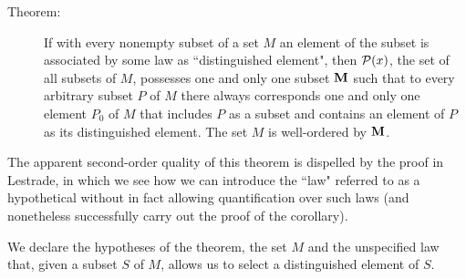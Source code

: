 \documentclass[12pt]{article}
\begin{document}
\begin{description}

\item[Theorem:]  If with every nonempty subset of a set $M$ an element of the subset is associated by some law as ``distinguished element", then ${\cal P}(x)$, the set of all subsets of $M$, possesses one and only one subset ${\bf M}$ such that to every arbitrary subset $P$ of $M$  there always corresponds one and only one element $P_0$ of $M$ that includes $P$ as a subset and contains an element of $P$ as its distinguished element.  The set $M$ is well-ordered by ${\bf M}$.

\end{description}

The apparent second-order quality of this theorem is dispelled by the proof in Lestrade, in which we see how we can introduce the ``law" referred to as a hypothetical without in fact allowing quantification over such laws (and nonetheless successfully carry out the proof of the corollary).



We declare the hypotheses of the theorem, the set $M$ and the unspecified law that, given a subset $S$ of $M$, allows us to select a distinguished element of $S$.
\end{document}

